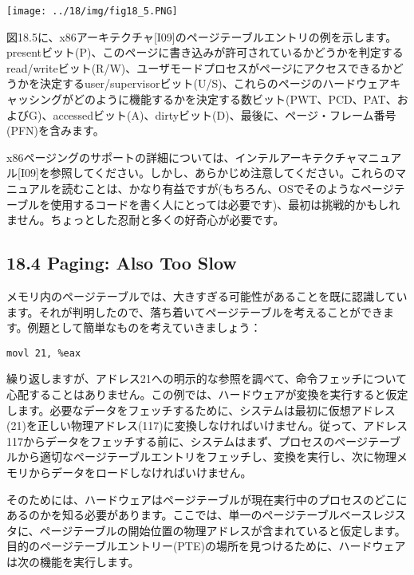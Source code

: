 \texttt{[image: ../18/img/fig18\_5.PNG]}

図18.5に、x86アーキテクチャ{[}I09{]}のページテーブルエントリの例を示します。presentビット(P)、このページに書き込みが許可されているかどうかを判定するread/writeビット(R/W)、ユーザモードプロセスがページにアクセスできるかどうかを決定するuser/supervisorビット(U/S)、これらのページのハードウェアキャッシングがどのように機能するかを決定する数ビット(PWT、PCD、PAT、およびG)、accessedビット(A)、dirtyビット(D)、最後に、ページ・フレーム番号(PFN)を含みます。

x86ページングのサポートの詳細については、インテルアーキテクチャマニュアル{[}I09{]}を参照してください。しかし、あらかじめ注意してください。これらのマニュアルを読むことは、かなり有益ですが(もちろん、OSでそのようなページテーブルを使用するコードを書く人にとっては必要です)、最初は挑戦的かもしれません。ちょっとした忍耐と多くの好奇心が必要です。

\hypertarget{paging-also-too-slow}{%
\subsection*{18.4 Paging: Also Too Slow}\label{paging-also-too-slow}}

メモリ内のページテーブルでは、大きすぎる可能性があることを既に認識しています。それが判明したので、落ち着いてページテーブルを考えることができます。例題として簡単なものを考えていきましょう：

\begin{verbatim}
movl 21, %eax
\end{verbatim}

繰り返しますが、アドレス21への明示的な参照を調べて、命令フェッチについて心配することはありません。この例では、ハードウェアが変換を実行すると仮定します。必要なデータをフェッチするために、システムは最初に仮想アドレス(21)を正しい物理アドレス(117)に変換しなければいけません。従って、アドレス117からデータをフェッチする前に、システムはまず、プロセスのページテーブルから適切なページテーブルエントリをフェッチし、変換を実行し、次に物理メモリからデータをロードしなければいけません。

そのためには、ハードウェアはページテーブルが現在実行中のプロセスのどこにあるのかを知る必要があります。ここでは、単一のページテーブルベースレジスタに、ページテーブルの開始位置の物理アドレスが含まれていると仮定します。目的のページテーブルエントリー(PTE)の場所を見つけるために、ハードウェアは次の機能を実行します。

\begin{Shaded}
\begin{Highlighting}[]
\end{Highlighting}
\end{Shaded}

